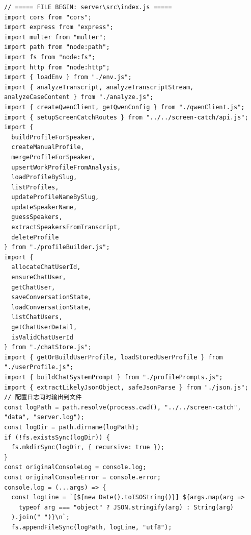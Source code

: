 \documentclass[12pt,a4paper]{article}
\begin{document}
\begin{Verbatim}[fontsize=\footnotesize]
// ===== FILE BEGIN: server\src\index.js =====
import cors from "cors";
import express from "express";
import multer from "multer";
import path from "node:path";
import fs from "node:fs";
import http from "node:http";
import { loadEnv } from "./env.js";
import { analyzeTranscript, analyzeTranscriptStream, analyzeCaseContent } from "./analyze.js";
import { createQwenClient, getQwenConfig } from "./qwenClient.js";
import { setupScreenCatchRoutes } from "../../screen-catch/api.js";
import {
  buildProfileForSpeaker,
  createManualProfile,
  mergeProfileForSpeaker,
  upsertWorkProfileFromAnalysis,
  loadProfileBySlug,
  listProfiles,
  updateProfileNameBySlug,
  updateSpeakerName,
  guessSpeakers,
  extractSpeakersFromTranscript,
  deleteProfile
} from "./profileBuilder.js";
import {
  allocateChatUserId,
  ensureChatUser,
  getChatUser,
  saveConversationState,
  loadConversationState,
  listChatUsers,
  getChatUserDetail,
  isValidChatUserId
} from "./chatStore.js";
import { getOrBuildUserProfile, loadStoredUserProfile } from "./userProfile.js";
import { buildChatSystemPrompt } from "./profilePrompts.js";
import { extractLikelyJsonObject, safeJsonParse } from "./json.js";
// 配置日志同时输出到文件
const logPath = path.resolve(process.cwd(), "../../screen-catch", "data", "server.log");
const logDir = path.dirname(logPath);
if (!fs.existsSync(logDir)) {
  fs.mkdirSync(logDir, { recursive: true });
}
const originalConsoleLog = console.log;
const originalConsoleError = console.error;
console.log = (...args) => {
  const logLine = `[${new Date().toISOString()}] ${args.map(arg =>
    typeof arg === "object" ? JSON.stringify(arg) : String(arg)
  ).join(" ")}\n`;
  fs.appendFileSync(logPath, logLine, "utf8");
\end{Verbatim}
\newpage
{}
\fancyhead[R]{}
\end{document}
